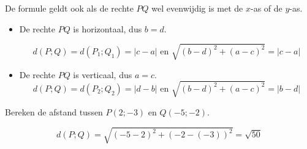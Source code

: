 De formule geldt ook als de rechte $PQ$ wel evenwijdig is met de $x$-as of de $y$-as.
\begin{itemize}
\item De rechte $PQ$ is horizontaal, dus $b=d$.



\[
d(P;Q)=d(P_1;Q_1)=\vert c-a \vert \text { en } \sqrt { (b-d)^2+(a-c)^2 }=\vert c-a \vert
\]
\item De rechte $PQ$ is verticaal, dus $a=c$.
\[
d(P;Q)=d(P_2;Q_2)=\vert d-b \vert \text { en } \sqrt { (b-d)^2+(a-c)^2 }=\vert b-d \vert
\]
\end{itemize}\vspace{2mm}

\newpage

\begin{voorbeeld}
Bereken de afstand tussen $P(2;-3)$ en $Q(-5;-2)$.


\[
d(P;Q)=\sqrt{(-5-2)^2+(-2-(-3))^2}=\sqrt{50}
\]\vspace{3mm}

\end{voorbeeld}

